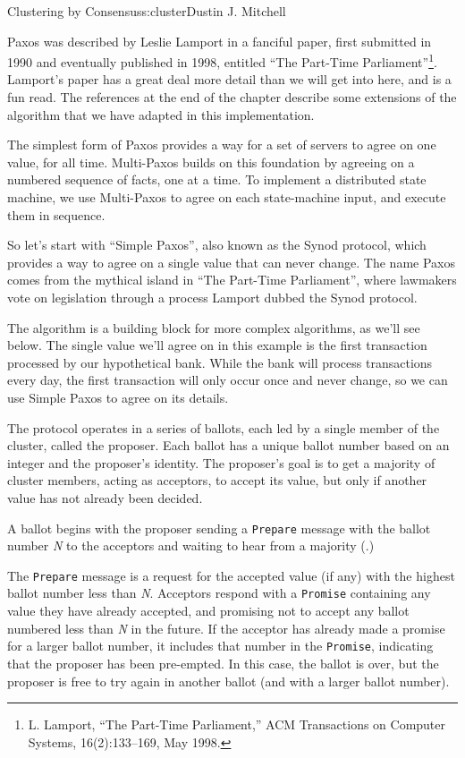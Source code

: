 \begin{aosachapter}{Clustering by Consensus}{s:cluster}{Dustin J. Mitchell}
\label{consensus-by-paxos}

Paxos was described by Leslie Lamport in a fanciful paper, first
submitted in 1990 and eventually published in 1998, entitled ``The
Part-Time Parliament''\footnote{L. Lamport, ``The Part-Time
  Parliament,'' ACM Transactions on Computer Systems, 16(2):133--169,
  May 1998.}. Lamport's paper has a great deal more detail than we will
get into here, and is a fun read. The references at the end of the
chapter describe some extensions of the algorithm that we have adapted
in this implementation.

The simplest form of Paxos provides a way for a set of servers to agree
on one value, for all time. Multi-Paxos builds on this foundation by
agreeing on a numbered sequence of facts, one at a time. To implement a
distributed state machine, we use Multi-Paxos to agree on each
state-machine input, and execute them in sequence.

\label{simple-paxos}

So let's start with ``Simple Paxos'', also known as the Synod protocol,
which provides a way to agree on a single value that can never change.
The name Paxos comes from the mythical island in ``The Part-Time
Parliament'', where lawmakers vote on legislation through a process
Lamport dubbed the Synod protocol.

The algorithm is a building block for more complex algorithms, as we'll
see below. The single value we'll agree on in this example is the first
transaction processed by our hypothetical bank. While the bank will
process transactions every day, the first transaction will only occur
once and never change, so we can use Simple Paxos to agree on its
details.

The protocol operates in a series of ballots, each led by a single
member of the cluster, called the proposer. Each ballot has a unique
ballot number based on an integer and the proposer's identity. The
proposer's goal is to get a majority of cluster members, acting as
acceptors, to accept its value, but only if another value has not
already been decided.


A ballot begins with the proposer sending a \texttt{Prepare} message
with the ballot number \emph{N} to the acceptors and waiting to hear
from a majority (.)

The \texttt{Prepare} message is a request for the accepted value (if
any) with the highest ballot number less than \emph{N}. Acceptors
respond with a \texttt{Promise} containing any value they have already
accepted, and promising not to accept any ballot numbered less than
\emph{N} in the future. If the acceptor has already made a promise for a
larger ballot number, it includes that number in the \texttt{Promise},
indicating that the proposer has been pre-empted. In this case, the
ballot is over, but the proposer is free to try again in another ballot
(and with a larger ballot number).


\end{aosachapter}
